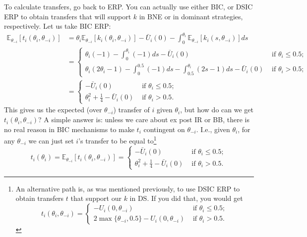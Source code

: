 \documentclass[a4paper]{article}
\begin{document}
\begin{enumerate}
	To calculate transfers, go back to ERP. You can actually use either BIC, or DSIC ERP to obtain transfers that will support $k$ in BNE or in dominant strategies, respectively. Let us take BIC ERP:
	\begin{align*}
		\mathbb{E}_{\theta_{-i}} [t_i(\theta_i,\theta_{-i})] 
		&= \theta_i \mathbb{E}_{\theta_{-i}} [k_i(\theta_i,\theta_{-i})] - \bar{U}_i(0) - \int_0^{\theta_i} \mathbb{E}_{\theta_{-i}} [k_i(s,\theta_{-i})] ds
		\\
		&= \begin{cases}
			\theta_i(-1) - \int_0^{\theta_i}(-1)ds - \bar{U}_i(0)	& \text{ if } \theta_i \leq 0.5;
			\\
			\theta_i (2\theta_i-1) - \int_0^{0.5}(-1)ds - \int_{0.5}^{\theta_i} (2s-1) ds - \bar{U}_i(0)	& \text{ if } \theta_i > 0.5;
		\end{cases}
		\\
		&= \begin{cases}
			- \bar{U}_i(0)	& \text{ if } \theta_i \leq 0.5;
			\\
			\theta_i^2 + \frac{1}{4} - \bar{U}_i(0)	& \text{ if } \theta_i > 0.5.
		\end{cases}
	\end{align*}
	This gives us the expected (over $\theta_{-i}$) transfer of $i$ given $\theta_i$, but how do can we get $t_i(\theta_i, \theta_{-i})$? A simple answer is: unless we care about ex post IR or BB, there is no real reason in BIC mechanisms to make $t_i$ contingent on $\theta_{-i}$. I.e., given $\theta_i$, for any $\theta_{-i}$ we can just set $i$'s transfer to be equal to\footnote{
		An alternative path is, as was mentioned previously, to use DSIC ERP to obtain transfers $t$ that support our $k$ in DS. If you did that, you would get
		$$t_i(\theta_i,\theta_{-i}) = 
		\begin{cases}
			- U_i(0,\theta_{-i})	& \text{ if } \theta_i \leq 0.5;
			\\
			2\max\{\theta_{-i}, 0.5\} - U_i(0,\theta_{-i})	& \text{ if } \theta_i > 0.5.
		\end{cases}$$
	} 
	$$t_i(\theta_i) = \mathbb{E}_{\theta_{-i}} [t_i(\theta_i,\theta_{-i})] = 
	\begin{cases}
		- \bar{U}_i(0)	& \text{ if } \theta_i \leq 0.5;
		\\
		\theta_i^2 + \frac{1}{4} - \bar{U}_i(0)	& \text{ if } \theta_i > 0.5.
	\end{cases}$$
	

\end{enumerate}
\end{document}

